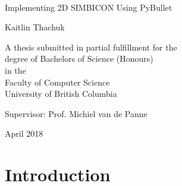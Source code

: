 \documentclass[12pt, a4paper]{article}
\begin{document}
\begin{titlepage}

\centering
\Large

~\vspace{\fill}

{\huge 
Implementing 2D SIMBICON Using PyBullet
}

\vspace{1.5cm}

{\LARGE
Kaitlin Thachuk
}

\vspace{3.5cm}

A thesis submitted in partial fulfillment for the\\
degree of Bachelors of Science (Honours)\\[1em]
in the\\[1em]
Faculty of Computer Science\\[1em]
University of British Columbia

\vspace{3.5cm}

Supervisor: Prof. Michiel van de Panne

\vspace{\fill}

April 2018
\end{titlepage}
\begin{titlepage}


\begin{abstract}
This project explores locomotion of a biped in two dimensions using the SIMBICON (simple biped locomtion control) framework. The project is completed in a newer physics engine PyBullet and the character is represented using MuJoCo XML. The SIMBICON framework includes implementing a basic four state finite state machine which drives the walking motion of the character. Balance feedback, torso control using the stance leg torque, and decoupling the swing foot placement from the torso pitch all contribute to enabling the character to walk in a balanced manner. Torques for all the joints are calculated using proportional-derivative (PD) controllers. The results of this project are a set of target angles, feedback parameters, and gain parameters which are utilized in the main program 
\end{abstract}
\end{titlepage}
\newpage
{}
\tableofcontents
\listoffigures
\listoftables

\newpage
\section{Introduction}
\end{document}
